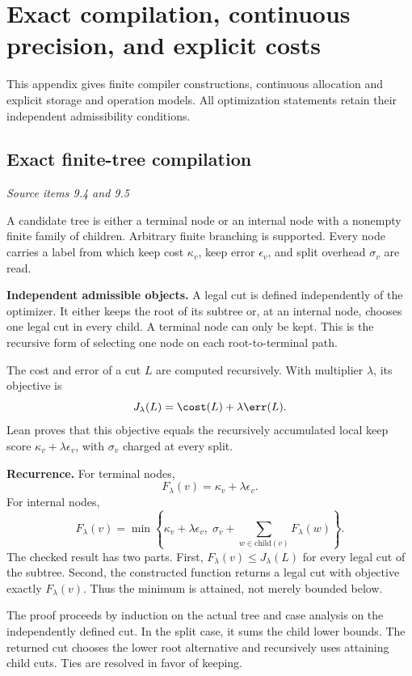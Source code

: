 \clearpage\FloatBarrier\section{Exact compilation, continuous precision, and explicit costs}\label{supp2:section:001}
This appendix gives finite compiler constructions, continuous allocation and explicit storage and operation models. All optimization statements retain their independent admissibility conditions.\par

\subsection{Exact finite-tree compilation}\label{supp2:subsection:001}\textit{Source items 9.4 and 9.5}\par
A candidate tree is either a terminal node or an internal node with a nonempty finite family of children. Arbitrary finite branching is supported. Every node carries a label from which keep cost $\kappa_v$, keep error $\epsilon_v$, and split overhead $\sigma_v$ are read.

\textbf{Independent admissible objects.} A legal cut is defined independently of the optimizer. It either keeps the root of its subtree or, at an internal node, chooses one legal cut in every child. A terminal node can only be kept. This is the recursive form of selecting one node on each root-to-terminal path.

The cost and error of a cut $L$ are computed recursively. With multiplier $\lambda$, its objective is
\[
J_\lambda(L)=\cost(L)+\lambda\err(L).
\]
Lean proves that this objective equals the recursively accumulated local keep score $\kappa_v+\lambda\epsilon_v$, with $\sigma_v$ charged at every split.

\textbf{Recurrence.} For terminal nodes,
\[
F_\lambda(v)=\kappa_v+\lambda\epsilon_v.
\]
For internal nodes,
\[
\boxed{F_\lambda(v)=\min\left\{\kappa_v+\lambda\epsilon_v,
\;\sigma_v+\sum_{w\in\mathrm{child}(v)}F_\lambda(w)\right\}.}
\]
The checked result has two parts. First, $F_\lambda(v)\leq J_\lambda(L)$ for every legal cut of the subtree. Second, the constructed function  returns a legal cut with objective exactly $F_\lambda(v)$. Thus the minimum is attained, not merely bounded below.

The proof proceeds by induction on the actual tree and case analysis on the independently defined cut. In the split case, it sums the child lower bounds. The returned cut chooses the lower root alternative and recursively uses attaining child cuts. Ties are resolved in favor of keeping.

